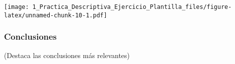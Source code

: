 \documentclass[
]{article}
\newenvironment{Shaded}{\begin{snugshade}}{\end{snugshade}}
\newcommand{\CommentTok}[1]{\textcolor[rgb]{0.56,0.35,0.01}{\textit{#1}}}
\newcommand{\KeywordTok}[1]{\textcolor[rgb]{0.13,0.29,0.53}{\textbf{#1}}}
\newcommand{\NormalTok}[1]{#1}
\newcommand{\OperatorTok}[1]{\textcolor[rgb]{0.81,0.36,0.00}{\textbf{#1}}}
\newcommand{\StringTok}[1]{\textcolor[rgb]{0.31,0.60,0.02}{#1}}
\begin{document}
\begin{Shaded}
\end{Shaded}

\texttt{[image: 1\_Practica\_Descriptiva\_Ejercicio\_Plantilla\_files/figure-latex/unnamed-chunk-10-1.pdf]}

\hypertarget{conclusiones}{%
\subsubsection{Conclusiones}\label{conclusiones}}

(Destaca las conclusiones más relevantes)
\end{document}
